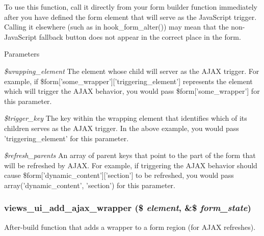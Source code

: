 To use this function, call it directly from your form builder function immediately after you have defined the form element that will serve as the JavaScript trigger. Calling it elsewhere (such as in hook\_\-form\_\-alter()) may mean that the non-\/JavaScript fallback button does not appear in the correct place in the form.


\begin{DoxyParams}{Parameters}
\item[{\em \$wrapping\_\-element}]The element whose child will server as the AJAX trigger. For example, if \$form\mbox{[}'some\_\-wrapper'\mbox{]}\mbox{[}'triggering\_\-element'\mbox{]} represents the element which will trigger the AJAX behavior, you would pass \$form\mbox{[}'some\_\-wrapper'\mbox{]} for this parameter. \item[{\em \$trigger\_\-key}]The key within the wrapping element that identifies which of its children serves as the AJAX trigger. In the above example, you would pass 'triggering\_\-element' for this parameter. \item[{\em \$refresh\_\-parents}]An array of parent keys that point to the part of the form that will be refreshed by AJAX. For example, if triggering the AJAX behavior should cause \$form\mbox{[}'dynamic\_\-content'\mbox{]}\mbox{[}'section'\mbox{]} to be refreshed, you would pass array('dynamic\_\-content', 'section') for this parameter. \end{DoxyParams}
\hypertarget{admin_8inc_a5c7fbab40819d08a0223ac25532cc82c}{
\subsubsection[{views\_\-ui\_\-add\_\-ajax\_\-wrapper}]{\setlength{\rightskip}{0pt plus 5cm}views\_\-ui\_\-add\_\-ajax\_\-wrapper (\$ {\em element}, \/  \&\$ {\em form\_\-state})}}
\label{admin_8inc_a5c7fbab40819d08a0223ac25532cc82c}
After-\/build function that adds a wrapper to a form region (for AJAX refreshes).

